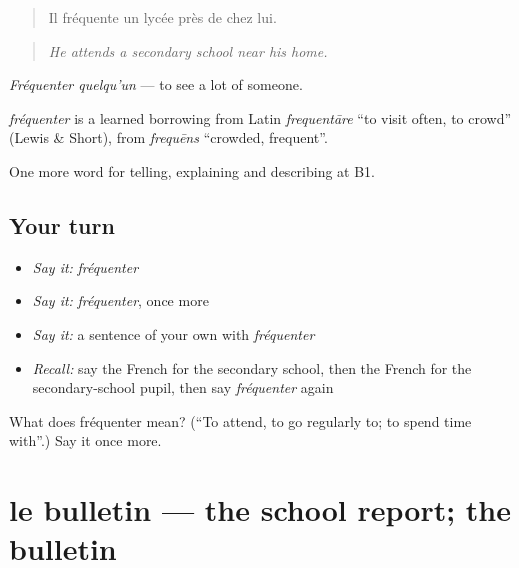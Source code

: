 \begin{quote}
Il fréquente un lycée près de chez lui.
\end{quote}

\begin{quote}
\emph{He attends a secondary school near his home.}
\end{quote}

\emph{Fréquenter quelqu'un} — to see a lot of someone.

\begin{cousinweb}
\emph{fréquenter} is a learned borrowing from Latin \emph{frequentāre} \textquotedblleft{}to visit often, to crowd\textquotedblright{} (Lewis \& Short), from \emph{frequēns} \textquotedblleft{}crowded, frequent\textquotedblright{}.
\end{cousinweb}

\begin{grammarlens}[title={What you've built}]
One more word for telling, explaining and describing at B1.
\end{grammarlens}

\subsection*{Your turn}
\begin{itemize}
\raggedright
  \item \emph{Say it:} \emph{fréquenter}
  \item \emph{Say it:} \emph{fréquenter}, once more
  \item \emph{Say it:} a sentence of your own with \emph{fréquenter}
  \item \emph{Recall:} say the French for the secondary school, then the French for the secondary-school pupil, then say \emph{fréquenter} again
\end{itemize}

\begin{tcolorbox}[breakable,colback=teal!4,colframe=teal!35!black,title={Before you move on}]
What does fréquenter mean? (\textquotedblleft{}To attend, to go regularly to; to spend time with\textquotedblright{}.) Say it once more.
\end{tcolorbox}
\section[le bulletin]{le bulletin — the school report; the bulletin}

\label{lesson:FR-C375-bulletin}



